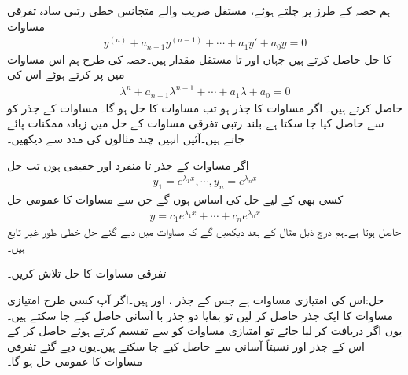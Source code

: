 ہم حصہ  کے طرز پر چلتے ہوئے، مستقل  ضریب  والے متجانس خطی  رتبی  سادہ تفرقی مساوات
\begin{align}\label{مساوات_سادہ_بلند_مستقل_سر_متجانس_الف}
y^{(n)}+a_{n-1}y^{(n-1)}+\cdots+a_1y'+a_0y=0
\end{align}
کا حل حاصل کرتے ہیں جہاں  اور  تا  مستقل مقدار ہیں۔حصہ  کی طرح ہم اس مساوات میں  پر کرتے ہوئے اس کی  
\begin{align}\label{مساوات_سادہ_بلند_مستقل_سر_متجانس_ب}
\lambda^n+a_{n-1}\lambda^{n-1}+\cdots+a_1 \lambda+a_0=0
\end{align}
حاصل کرتے ہیں۔ اگر  مساوات  کا جذر ہو تب  مساوات  کا حل ہو گا۔ مساوات  کے جذر کو  سے حاصل کیا جا سکتا ہے۔بلند رتبی  تفرقی مساوات کے حل میں زیادہ ممکنات پائے جاتے ہیں۔آئیں انہیں چند مثالوں کی مدد سے دیکھیں۔

اگر مساوات  کے  جذر  تا  منفرد اور حقیقی ہوں  تب حل
\begin{align}\label{مساوات_سادہ_بلند_مستقل_سر_متجانس_پ}
y_1=e^{\lambda_1 x}, \cdots , y_n=e^{\lambda_n x}
\end{align}
کسی بھی  کے لیے حل کی اساس ہوں گے جن سے مساوات  کا عمومی حل
\begin{align}\label{مساوات_سادہ_بلند_مستقل_سر_متجانس_ت}
y=c_1 e^{\lambda_1 x}+\cdots+c_n e^{\lambda_n x}
\end{align}
حاصل ہوتا ہے۔ہم درج ذیل مثال کے بعد دیکھیں گے کہ مساوات  میں دیے گئے حل خطی طور غیر تابع ہیں۔

تفرقی مساوات  کا حل تلاش کریں۔

حل:اس کی امتیازی مساوات  ہے جس کے جذر ،  اور  ہیں۔اگر آپ کسی طرح امتیازی مساوات کا ایک جذر حاصل کر لیں تو بقایا دو جذر با آسانی حاصل کیے جا سکتے ہیں۔یوں اگر  دریافت کر لیا جائے تو امتیازی مساوات کو  سے تقسیم کرتے ہوئے   حاصل کر کے اس کے جذر  اور  نسبتاً آسانی سے حاصل کیے جا سکتے ہیں۔یوں دیے گئے تفرقی مساوات کا  عمومی حل  ہو گا۔

